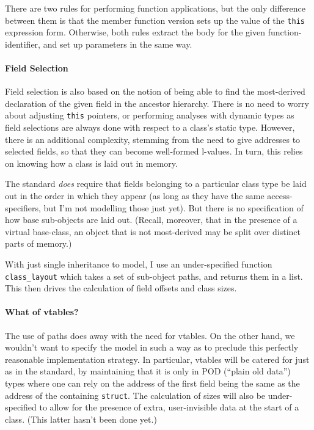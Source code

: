 \documentclass[11pt]{article}
\begin{document}
There are two rules for performing function applications, but the only
difference between them is that the member function version sets up
the value of the \texttt{this} expression form.  Otherwise, both rules
extract the body for the given function-identifier, and set up
parameters in the same way.

\paragraph{Field Selection}
Field selection is also based on the notion of being able to find the
most-derived declaration of the given field in the ancestor hierarchy.
There is no need to worry about adjusting \texttt{this} pointers, or
performing analyses with dynamic types as field selections are always
done with respect to a class's static type.  However, there is an
additional complexity, stemming from the need to give addresses to
selected fields, so that they can become well-formed l-values.  In
turn, this relies on knowing how a class is laid out in memory.

The standard \emph{does} require that fields belonging to a particular
class type be laid out in the order in which they appear (as long as
they have the same access-specifiers, but I'm not modelling those just
yet).  But there is no specification of how base sub-objects are laid
out.  (Recall, moreover, that in the presence of a virtual base-class,
an object that is not most-derived may be split over distinct parts of
memory.)

With just single inheritance to model, I use an under-specified
function \texttt{class\_layout} which takes a set of sub-object paths,
and returns them in a list.  This then drives the calculation of field
offsets and class sizes.

\paragraph{What of vtables?}
The use of paths does away with the need for vtables.  On the other
hand, we wouldn't want to specify the model in such a way as to
preclude this perfectly reasonable implementation strategy.  In
particular, vtables will be catered for just as in the standard, by
maintaining that it is only in POD (``plain old data'') types where
one can rely on the address of the first field being the same as the
address of the containing \texttt{struct}.  The calculation of sizes
will also be under-specified to allow for the presence of extra,
user-invisible data at the start of a class.  (This latter hasn't been
done yet.)
\end{document}
